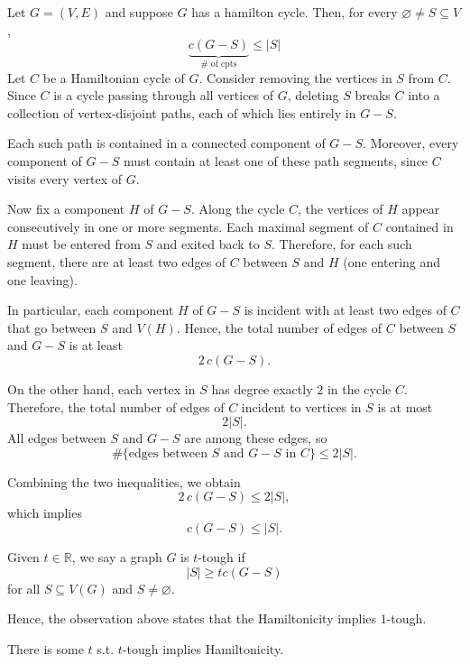 \newpage
{}
\begin{observation}
    Let \(G = (V, E)\) and suppose \(G\) has a hamilton cycle. Then, for every \(\varnothing \neq S \subseteq V\), 
    \[
        \underbrace{c(G - S)}_{\# \text{ of cpts}} \le \vert S \vert
    \]   
    Let $C$ be a Hamiltonian cycle of $G$. Consider removing the vertices in $S$ from $C$. Since $C$ is a cycle passing through all vertices of $G$, deleting $S$ breaks $C$ into a collection of vertex-disjoint paths, each of which lies entirely in $G - S$.

Each such path is contained in a connected component of $G - S$. Moreover, every component of $G - S$ must contain at least one of these path segments, since $C$ visits every vertex of $G$.

Now fix a component $H$ of $G - S$. Along the cycle $C$, the vertices of $H$ appear consecutively in one or more segments. Each maximal segment of $C$ contained in $H$ must be entered from $S$ and exited back to $S$. Therefore, for each such segment, there are at least two edges of $C$ between $S$ and $H$ (one entering and one leaving).

In particular, each component $H$ of $G - S$ is incident with at least two edges of $C$ that go between $S$ and $V(H)$. Hence, the total number of edges of $C$ between $S$ and $G - S$ is at least
\[
    2 \, c(G - S).
\]

On the other hand, each vertex in $S$ has degree exactly $2$ in the cycle $C$. Therefore, the total number of edges of $C$ incident to vertices in $S$ is at most
\[
    2|S|.
\]
All edges between $S$ and $G - S$ are among these edges, so
\[
    \#\{\text{edges between } S \text{ and } G - S \text{ in } C\} \le 2|S|.
\]

Combining the two inequalities, we obtain
\[
    2\,c(G - S) \le 2|S|,
\]
which implies
\[
    c(G - S) \le |S|.
\]
\end{observation}

\begin{definition}[toughness]
    Given \(t \in \mathbb{R} \), we say a graph \(G\) is \(t\)-tough if 
    \[
        \vert S \vert \ge t c(G - S) 
    \]   
    for all \(S \subseteq V(G)\) and \(S \neq \varnothing \).  
\end{definition}

Hence, the observation above states that the Hamiltonicity implies \(1\)-tough. 

\begin{conjecture}[Chvatal, 1973]
    There is some \(t\) s.t. \(t\)-tough implies Hamiltonicity.  
\end{conjecture}

